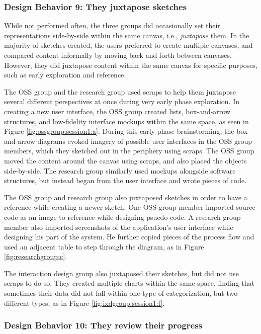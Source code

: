 \documentclass[12pt,fleqn]{ucithesis}
\begin{document}
\subsubsection{Design Behavior 9: They juxtapose sketches}

While not performed often, the three groups did occasionally set their representations side-by-side within the same canvas, i.e., \textit{juxtapose} them. In the majority of sketches created, the users preferred to create multiple canvases, and compared content informally by moving back and forth between canvases. However, they did juxtapose content within the same canvas for specific purposes, such as early exploration and reference.

The OSS group and the research group used scraps to help them juxtapose several different perspectives at once during very early phase exploration. In creating a new user interface, the OSS group created lists, box-and-arrow structures, and low-fidelity interface mockups within the same space, as seen in Figure \ref{fig:ossgroup:session1:a}. During this early phase brainstorming, the box-and-arrow diagrams evoked imagery of possible user interfaces in the OSS group members, which they sketched out in the periphery using scraps. The OSS group moved the content around the canvas using scraps, and also placed the objects side-by-side. The research group similarly used mockups alongside software structures, but instead began from the user interface and wrote pieces of code. 

The OSS group and research group also juxtaposed sketches in order to have a reference while creating a newer sketch. One OSS group member imported source code as an image to reference while designing psuedo code. A research group member also imported screenshots of the application's user interface while designing his part of the system. He further copied pieces of the process flow and used an adjacent table to step through the diagram, as in Figure \ref{fig:researchgroup:c}.

The interaction design group also juxtaposed their sketches, but did not use scraps to do so. They created multiple charts within the same space, finding that sometimes their data did not fall within one type of categorization, but two different types, as in Figure \ref{fig:ixdgroup:session1:f}. 

\subsubsection{Design Behavior 10: They review their progress}
\end{document}

